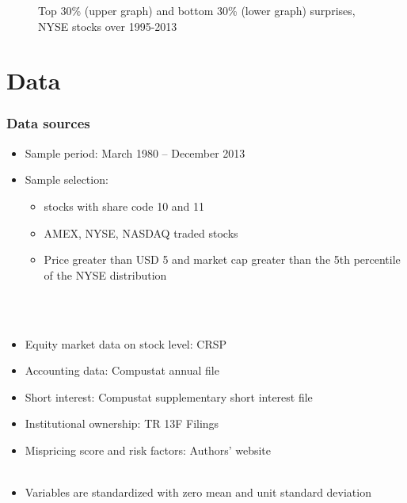 \documentclass{beamer}
\begin{document}
\begin{frame}
\begin{figure}[htbp]
\vspace*{-0.2cm}
\scriptsize{Top 30\% (upper graph) and bottom 30\% (lower graph) surprises, NYSE stocks over 1995-2013}
\end{figure}
\end{frame}


\section{Data}
\begin{frame}
	\frametitle{Data sources}
\begin{itemize}
\item Sample period: March 1980 -- December 2013
\item Sample selection:
\begin{itemize}
\item stocks with share code 10 and 11
\item AMEX, NYSE, NASDAQ traded stocks
\item Price greater than USD 5 and market cap greater than the 5th percentile of the NYSE distribution
\end{itemize}
\ \\
\ \\
\item Equity market data on stock level: CRSP
\item Accounting data: Compustat annual file
\item Short interest: Compustat supplementary short interest file
\item Institutional ownership: TR 13F Filings
\item Mispricing score and risk factors: Authors' website
\ \\
\ \\
\item Variables are standardized with zero mean and unit standard deviation
\end{itemize}
\end{frame}
\end{document}
